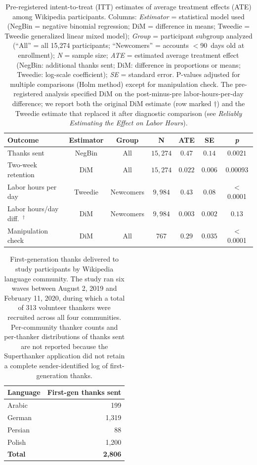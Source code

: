\documentclass[9pt,twoside,lineno]{pnas-new}
\begin{document}
\clearpage
\begin{table}
\centering
\caption{Pre-registered intent-to-treat (ITT) estimates of average treatment effects (ATE) among Wikipedia participants. Columns: \textit{Estimator} = statistical model used (NegBin = negative binomial regression; DiM = difference in means; Tweedie = Tweedie generalized linear mixed model); \textit{Group} = participant subgroup analyzed (``All'' = all 15,274 participants; ``Newcomers'' = accounts $<$90~days old at enrollment); \textit{N} = sample size; \textit{ATE} = estimated average treatment effect (NegBin: additional thanks sent; DiM: difference in proportions or means; Tweedie: log-scale coefficient); \textit{SE} = standard error. P-values adjusted for multiple comparisons (Holm method) except for manipulation check. The pre-registered analysis specified DiM on the post-minus-pre labor-hours-per-day difference; we report both the original DiM estimate (row marked $\dagger$) and the Tweedie estimate that replaced it after diagnostic comparison (see \textit{Reliably Estimating the Effect on Labor Hours}).}
\label{table:preregresults}
\begin{tabular}{l c c c c c c}
\hline
Outcome & Estimator & Group & N & ATE & SE & \textit{p} \\
\hline
Thanks sent & NegBin & All &
  $15,274$ &
  $0.47$ &
  $0.14$ &
  $0.0021$ \\
Two-week retention & DiM & All &
  $15,274$ &
  $0.022$ &
  $0.006$ &
  $0.00093$ \\
Labor hours per day & Tweedie & Newcomers &
  $9,984$ &
  $0.43$ &
  $0.08$ &
  $<$0.0001 \\
Labor hours/day diff.\ $^{\dagger}$ & DiM & Newcomers &
  $9,984$ &
  $0.003$ &
  $0.002$ &
  $0.13$ \\
Manipulation check & DiM & All &
  $767$ &
  $0.29$ &
  $0.035$ & $<$0.0001 \\
\hline
\end{tabular}
\end{table}




\clearpage
\begin{table}[ht]
\centering
\small
\caption{First-generation thanks delivered to study participants by Wikipedia language community. The study ran six waves between August 2, 2019 and February 11, 2020, during which a total of 313 volunteer thankers were recruited across all four communities. Per-community thanker counts and per-thanker distributions of thanks sent are not reported because the Superthanker application did not retain a complete sender-identified log of first-generation thanks.}
\label{table:thankers}
\begin{tabular}{l r}
\toprule
\textbf{Language} & \textbf{First-gen thanks sent} \\
\midrule
Arabic  & 199 \\
German  & 1{,}319 \\
Persian & 88 \\
Polish  & 1{,}200 \\
\midrule
\textbf{Total} & \textbf{2{,}806} \\
\bottomrule
\end{tabular}
\end{table}
\end{document}
